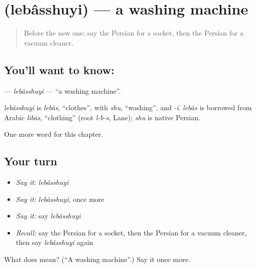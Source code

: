 \section[\texorpdfstring{\fa{لباسشویی} (lebâsshuyi)}{لباسشویی (lebâsshuyi)}]{ (lebâsshuyi) — a washing machine}

\label{lesson:FA-C175-lebasshuyi}



\begin{quote}
Before the new one: say the Persian for a socket, then the Persian for a vacuum cleaner.
\end{quote}

\subsection*{You'll want to know: }
\textbf{} — \emph{lebâsshuyi} — \textquotedblleft{}a washing machine\textquotedblright{}.

\begin{cousinweb}
\emph{lebâsshuyi} is \emph{lebâs}, \textquotedblleft{}clothes\textquotedblright{}, with \emph{shu}, \textquotedblleft{}washing\textquotedblright{}, and \emph{-i}. \emph{lebâs} is borrowed from Arabic \emph{libās}, \textquotedblleft{}clothing\textquotedblright{} (root \emph{l-b-s}, Lane); \emph{shu} is native Persian.
\end{cousinweb}

\begin{grammarlens}[title={What you've built}]
One more word for this chapter.
\end{grammarlens}

\subsection*{Your turn}
\begin{itemize}
\raggedright
  \item \emph{Say it:} \emph{lebâsshuyi}
  \item \emph{Say it:} \emph{lebâsshuyi}, once more
  \item \emph{Say it:} say \emph{lebâsshuyi}
  \item \emph{Recall:} say the Persian for a socket, then the Persian for a vacuum cleaner, then say \emph{lebâsshuyi} again
\end{itemize}

\begin{tcolorbox}[breakable,colback=teal!4,colframe=teal!35!black,title={Before you move on}]
What does  mean? (\textquotedblleft{}A washing machine\textquotedblright{}.) Say it once more.
\end{tcolorbox}
